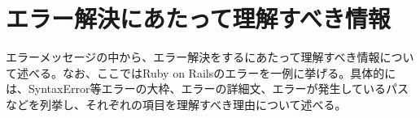 \documentclass[main]{subfiles}
\begin{document}
\chapter{エラー解決にあたって理解すべき情報}
エラーメッセージの中から、エラー解決をするにあたって理解すべき情報について述べる。なお、ここではRuby on Railsのエラーを一例に挙げる。具体的には、SyntaxError等エラーの大枠、エラーの詳細文、エラーが発生しているパスなどを列挙し、それぞれの項目を理解すべき理由について述べる。
\end{document}
